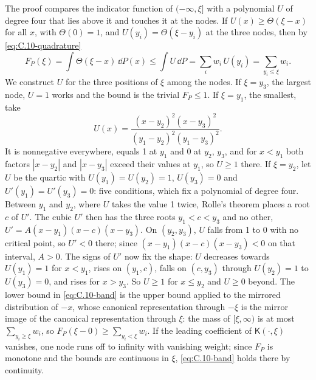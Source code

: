 The proof compares the indicator function of $(-\infty, \xi]$ with a polynomial $U$ of degree four that lies above it and touches it at the nodes. If $U(x) \ge \Theta(\xi - x)$ for all $x$, with $\Theta(0) = 1$, and $U(y_i) = \Theta(\xi - y_i)$ at the three nodes, then by \cref{eq:C.10-quadrature}
\begin{equation*}
  F_P(\xi) = \int\Theta(\xi - x)\,\dd P(x) \le \int U\,\dd P = \sum_i w_i\,U(y_i) = \sum_{y_i \le \xi} w_i .
\end{equation*}
We construct $U$ for the three positions of $\xi$ among the nodes. If $\xi = y_3$, the largest node, $U = 1$ works and the bound is the trivial $F_P \le 1$. If $\xi = y_1$, the smallest, take
\begin{equation*}
  U(x) = \frac{(x - y_2)^2(x - y_3)^2}{(y_1 - y_2)^2(y_1 - y_3)^2} .
\end{equation*}
It is nonnegative everywhere, equals 1 at $y_1$ and 0 at $y_2$, $y_3$, and for $x < y_1$ both factors $|x - y_2|$ and $|x - y_3|$ exceed their values at $y_1$, so $U \ge 1$ there. If $\xi = y_2$, let $U$ be the quartic with $U(y_1) = U(y_2) = 1$, $U(y_3) = 0$ and $U'(y_1) = U'(y_3) = 0$: five conditions, which fix a polynomial of degree four. Between $y_1$ and $y_2$, where $U$ takes the value 1 twice, Rolle's theorem places a root $c$ of $U'$. The cubic $U'$ then has the three roots $y_1 < c < y_3$ and no other, $U' = A(x - y_1)(x - c)(x - y_3)$. On $(y_2, y_3)$, $U$ falls from 1 to 0 with no critical point, so $U' < 0$ there; since $(x - y_1)(x - c)(x - y_3) < 0$ on that interval, $A > 0$. The signs of $U'$ now fix the shape: $U$ decreases towards $U(y_1) = 1$ for $x < y_1$, rises on $(y_1, c)$, falls on $(c, y_3)$ through $U(y_2) = 1$ to $U(y_3) = 0$, and rises for $x > y_3$. So $U \ge 1$ for $x \le y_2$ and $U \ge 0$ beyond. The lower bound in \cref{eq:C.10-band} is the upper bound applied to the mirrored distribution of $-x$, whose canonical representation through $-\xi$ is the mirror image of the canonical representation through $\xi$: the mass of $[\xi, \infty)$ is at most $\sum_{y_i \ge \xi} w_i$, so $F_P(\xi - 0) \ge \sum_{y_i < \xi} w_i$. If the leading coefficient of $\mathsf{K}(\cdot,\xi)$ vanishes, one node runs off to infinity with vanishing weight; since $F_P$ is monotone and the bounds are continuous in $\xi$, \cref{eq:C.10-band} holds there by continuity.

